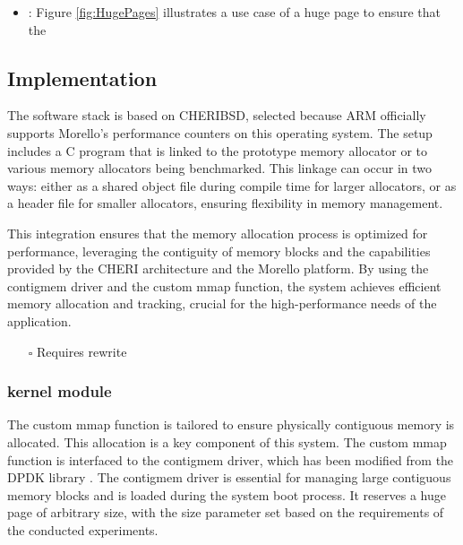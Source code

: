 \documentclass[11pt]{article}
\begin{document}
\begin{itemize}
\item\relax [ ]: Figure \ref{fig:HugePages} illustrates a use case of a huge page to ensure that the
\end{itemize}

\subsection{Implementation}
\label{sec:orgf762315}
The software stack is based on CHERIBSD, selected because ARM officially supports Morello's performance 
counters on this operating system. The setup includes a C program that 
is linked to the prototype memory allocator or to various memory allocators being benchmarked. This linkage can occur in two ways: either as a shared object file during compile time 
for larger allocators, or as a header file for smaller allocators, ensuring flexibility 
in memory management.

This integration ensures that the memory allocation process is optimized for performance, leveraging the contiguity 
of memory blocks and the capabilities provided by the CHERI architecture and the Morello platform. By using the 
contigmem driver and the custom mmap function, the system achieves efficient memory allocation and tracking, 
crucial for the high-performance needs of the application.

\begin{itemize}
\item[{$\square$}] Requires rewrite
\end{itemize}
\subsubsection{kernel module}
\label{sec:org94a3383}
The custom mmap function is tailored to ensure physically contiguous memory is allocated. This allocation is a key component 
of this system. The custom mmap function is interfaced to the contigmem driver, which has been modified from the DPDK library 
. The contigmem driver is essential for managing large contiguous 
memory blocks and is loaded during the system boot process. It reserves a huge page of arbitrary size, with the 
size parameter set based on the requirements of the conducted experiments.



\end{document}
